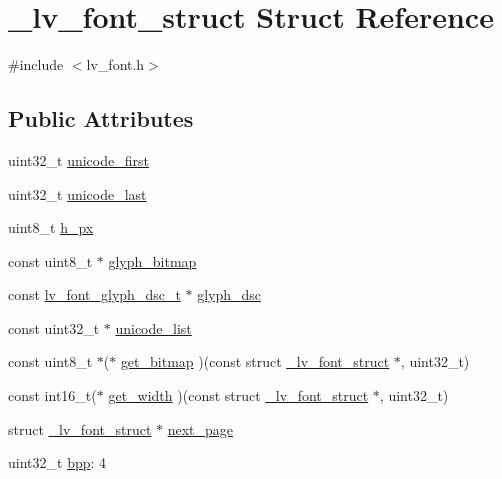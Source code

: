 \hypertarget{struct__lv__font__struct}{}\section{\+\_\+lv\+\_\+font\+\_\+struct Struct Reference}
\label{struct__lv__font__struct}


{\ttfamily \#include $<$lv\+\_\+font.\+h$>$}

\subsection*{Public Attributes}
\begin{DoxyCompactItemize}
\item 
uint32\+\_\+t \mbox{\hyperlink{struct__lv__font__struct_ae43f2d0f26b9ced6d36497d47bf1d3a9}{unicode\+\_\+first}}
\item 
uint32\+\_\+t \mbox{\hyperlink{struct__lv__font__struct_ae961ac0ee0c500debd41498a1df04bcf}{unicode\+\_\+last}}
\item 
uint8\+\_\+t \mbox{\hyperlink{struct__lv__font__struct_a76e3768fb23452cde87c4a19b882b717}{h\+\_\+px}}
\item 
const uint8\+\_\+t $\ast$ \mbox{\hyperlink{struct__lv__font__struct_a4f93ed5fdc6fc0adf474cf07d7b006d8}{glyph\+\_\+bitmap}}
\item 
const \mbox{\hyperlink{structlv__font__glyph__dsc__t}{lv\+\_\+font\+\_\+glyph\+\_\+dsc\+\_\+t}} $\ast$ \mbox{\hyperlink{struct__lv__font__struct_a6d208d451ea1b6d6cd3015274bbf3a4d}{glyph\+\_\+dsc}}
\item 
const uint32\+\_\+t $\ast$ \mbox{\hyperlink{struct__lv__font__struct_a60f7312cda820564e63c2bc644bbc623}{unicode\+\_\+list}}
\item 
const uint8\+\_\+t $\ast$($\ast$ \mbox{\hyperlink{struct__lv__font__struct_ad9fd5e7ab1fbaa989e59f1c14be095bc}{get\+\_\+bitmap}} )(const struct \mbox{\hyperlink{struct__lv__font__struct}{\+\_\+lv\+\_\+font\+\_\+struct}} $\ast$, uint32\+\_\+t)
\item 
const int16\+\_\+t($\ast$ \mbox{\hyperlink{struct__lv__font__struct_a26864af0785fe8bd4b038f2d53086a60}{get\+\_\+width}} )(const struct \mbox{\hyperlink{struct__lv__font__struct}{\+\_\+lv\+\_\+font\+\_\+struct}} $\ast$, uint32\+\_\+t)
\item 
struct \mbox{\hyperlink{struct__lv__font__struct}{\+\_\+lv\+\_\+font\+\_\+struct}} $\ast$ \mbox{\hyperlink{struct__lv__font__struct_a9f97a49208cd93e0f93a51aff3a8c8bb}{next\+\_\+page}}
\item 
uint32\+\_\+t \mbox{\hyperlink{struct__lv__font__struct_a9978847adaa97245112300b8cfa08f6b}{bpp}}\+: 4
\end{DoxyCompactItemize}


